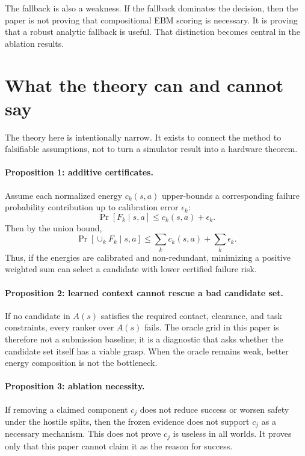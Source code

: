 \documentclass{article}
\begin{document}
The fallback is also a weakness.
If the fallback dominates the decision, then the paper is not proving that compositional EBM scoring is necessary.
It is proving that a robust analytic fallback is useful.
That distinction becomes central in the ablation results.

\section{What the theory can and cannot say}

The theory here is intentionally narrow.
It exists to connect the method to falsifiable assumptions, not to turn a simulator result into a hardware theorem.

\paragraph{Proposition 1: additive certificates.}
Assume each normalized energy $c_k(s,a)$ upper-bounds a corresponding failure probability contribution up to calibration error $\epsilon_k$:
\[
  \Pr[F_k \mid s,a] \le c_k(s,a)+\epsilon_k .
\]
Then by the union bound,
\[
  \Pr[\cup_k F_k \mid s,a]
  \le \sum_k c_k(s,a)+\sum_k \epsilon_k .
\]
Thus, if the energies are calibrated and non-redundant, minimizing a positive weighted sum can select a candidate with lower certified failure risk.

\paragraph{Proposition 2: learned context cannot rescue a bad candidate set.}
If no candidate in $A(s)$ satisfies the required contact, clearance, and task constraints, every ranker over $A(s)$ fails.
The oracle grid in this paper is therefore not a submission baseline; it is a diagnostic that asks whether the candidate set itself has a viable grasp.
When the oracle remains weak, better energy composition is not the bottleneck.

\paragraph{Proposition 3: ablation necessity.}
If removing a claimed component $c_j$ does not reduce success or worsen safety under the hostile splits, then the frozen evidence does not support $c_j$ as a necessary mechanism.
This does not prove $c_j$ is useless in all worlds.
It proves only that this paper cannot claim it as the reason for success.
\end{document}
